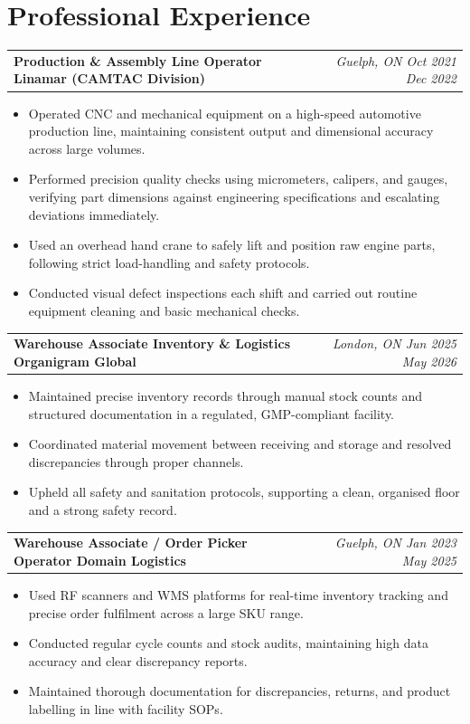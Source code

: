 \documentclass[10.5pt,letterpaper]{article}
\makeatletter
\newcommand{\jt}[4]{\noindent\begin{tabularx}{\linewidth}{@{}X r@{}}\textbf{#1} {\small\color{soft}\textit{#2}} & {\small\color{soft}\textit{#3}}\\\end{tabularx}\par\vspace{1pt}{\small\color{mid}#4}}
\makeatother
\begin{document}
\section{Professional Experience}
\jt{Production \& Assembly Line Operator \textendash{} Linamar (CAMTAC Division)}{}{Guelph, ON \quad\textbar\quad Oct 2021 \textendash{} Dec 2022}{}
\begin{itemize}
\item Operated CNC and mechanical equipment on a high-speed automotive production line, maintaining consistent output and dimensional accuracy across large volumes.
\item Performed precision quality checks using micrometers, calipers, and gauges, verifying part dimensions against engineering specifications and escalating deviations immediately.
\item Used an overhead hand crane to safely lift and position raw engine parts, following strict load-handling and safety protocols.
\item Conducted visual defect inspections each shift and carried out routine equipment cleaning and basic mechanical checks.
\end{itemize}
\vspace{6pt}
\jt{Warehouse Associate \textendash{} Inventory \& Logistics \textendash{} Organigram Global}{}{London, ON \quad\textbar\quad Jun 2025 \textendash{} May 2026}{}
\begin{itemize}
\item Maintained precise inventory records through manual stock counts and structured documentation in a regulated, GMP-compliant facility.
\item Coordinated material movement between receiving and storage and resolved discrepancies through proper channels.
\item Upheld all safety and sanitation protocols, supporting a clean, organised floor and a strong safety record.
\end{itemize}
\vspace{6pt}
\jt{Warehouse Associate / Order Picker Operator \textendash{} Domain Logistics}{}{Guelph, ON \quad\textbar\quad Jan 2023 \textendash{} May 2025}{}
\begin{itemize}
\item Used RF scanners and WMS platforms for real-time inventory tracking and precise order fulfilment across a large SKU range.
\item Conducted regular cycle counts and stock audits, maintaining high data accuracy and clear discrepancy reports.
\item Maintained thorough documentation for discrepancies, returns, and product labelling in line with facility SOPs.
\end{itemize}
\end{document}

